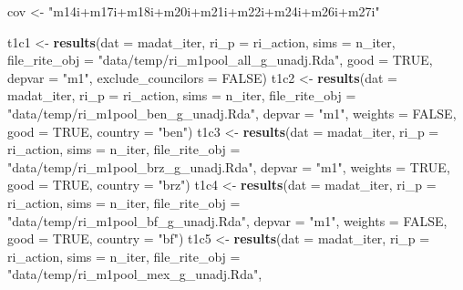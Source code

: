 \documentclass[]{article}
\newenvironment{Shaded}{\begin{snugshade}}{\end{snugshade}}
\newcommand{\KeywordTok}[1]{\textcolor[rgb]{0.13,0.29,0.53}{\textbf{#1}}}
\newcommand{\DataTypeTok}[1]{\textcolor[rgb]{0.13,0.29,0.53}{#1}}
\newcommand{\StringTok}[1]{\textcolor[rgb]{0.31,0.60,0.02}{#1}}
\newcommand{\OtherTok}[1]{\textcolor[rgb]{0.56,0.35,0.01}{#1}}
\newcommand{\NormalTok}[1]{#1}
\begin{document}
\begin{Shaded}
\begin{Highlighting}[]
\NormalTok{  cov <-}\StringTok{ "m14i+m17i+m18i+m20i+m21i+m22i+m24i+m26i+m27i"}

\NormalTok{  t1c1 <-}\StringTok{  }\KeywordTok{results}\NormalTok{(}\DataTypeTok{dat =}\NormalTok{ madat_iter, }\DataTypeTok{ri_p =}\NormalTok{ ri_action, }\DataTypeTok{sims =}\NormalTok{ n_iter,}
                  \DataTypeTok{file_rite_obj =} \StringTok{"data/temp/ri_m1pool_all_g_unadj.Rda"}\NormalTok{,}
                  \DataTypeTok{good =} \OtherTok{TRUE}\NormalTok{, }\DataTypeTok{depvar =} \StringTok{"m1"}\NormalTok{, }\DataTypeTok{exclude_councilors =} \OtherTok{FALSE}\NormalTok{)}
\NormalTok{  t1c2 <-}\StringTok{ }\KeywordTok{results}\NormalTok{(}\DataTypeTok{dat =}\NormalTok{ madat_iter, }\DataTypeTok{ri_p =}\NormalTok{ ri_action, }\DataTypeTok{sims =}\NormalTok{ n_iter,}
                  \DataTypeTok{file_rite_obj =} \StringTok{"data/temp/ri_m1pool_ben_g_unadj.Rda"}\NormalTok{,}
                  \DataTypeTok{depvar =} \StringTok{"m1"}\NormalTok{, }\DataTypeTok{weights =} \OtherTok{FALSE}\NormalTok{, }\DataTypeTok{good =} \OtherTok{TRUE}\NormalTok{, }\DataTypeTok{country =} \StringTok{"ben"}\NormalTok{)}
\NormalTok{  t1c3 <-}\StringTok{ }\KeywordTok{results}\NormalTok{(}\DataTypeTok{dat =}\NormalTok{ madat_iter, }\DataTypeTok{ri_p =}\NormalTok{ ri_action, }\DataTypeTok{sims =}\NormalTok{ n_iter,}
                  \DataTypeTok{file_rite_obj =} \StringTok{"data/temp/ri_m1pool_brz_g_unadj.Rda"}\NormalTok{,}
                  \DataTypeTok{depvar =} \StringTok{"m1"}\NormalTok{, }\DataTypeTok{weights =} \OtherTok{TRUE}\NormalTok{,  }\DataTypeTok{good =} \OtherTok{TRUE}\NormalTok{, }\DataTypeTok{country =} \StringTok{"brz"}\NormalTok{)}
\NormalTok{  t1c4 <-}\StringTok{ }\KeywordTok{results}\NormalTok{(}\DataTypeTok{dat =}\NormalTok{ madat_iter, }\DataTypeTok{ri_p =}\NormalTok{ ri_action, }\DataTypeTok{sims =}\NormalTok{ n_iter,}
                  \DataTypeTok{file_rite_obj =} \StringTok{"data/temp/ri_m1pool_bf_g_unadj.Rda"}\NormalTok{,}
                  \DataTypeTok{depvar =} \StringTok{"m1"}\NormalTok{, }\DataTypeTok{weights =} \OtherTok{FALSE}\NormalTok{, }\DataTypeTok{good =} \OtherTok{TRUE}\NormalTok{, }\DataTypeTok{country =} \StringTok{"bf"}\NormalTok{)}
\NormalTok{  t1c5 <-}\StringTok{ }\KeywordTok{results}\NormalTok{(}\DataTypeTok{dat =}\NormalTok{ madat_iter, }\DataTypeTok{ri_p =}\NormalTok{ ri_action, }\DataTypeTok{sims =}\NormalTok{ n_iter,}
                  \DataTypeTok{file_rite_obj =} \StringTok{"data/temp/ri_m1pool_mex_g_unadj.Rda"}\NormalTok{,}

\end{Highlighting}
\end{Shaded}
\end{document}
